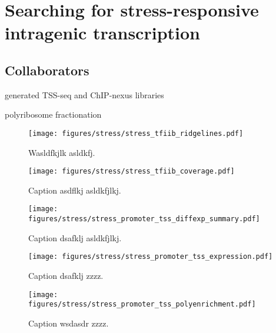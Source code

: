 \chapter{Searching for stress-responsive intragenic transcription}

\section{Collaborators}

\begin{description}[align=right, labelwidth=5cm, noitemsep]
    \item [Steve Doris] generated TSS-seq and ChIP-nexus libraries
    \item [Dan Spatt] polyribosome fractionation
\end{description}

\begin{figure}
\texttt{[image: figures/stress/stress\_tfiib\_ridgelines.pdf]}
\caption[TFIIB coverage over all genes with stress-induced intragenic TFIIB peaks.]{Wasldfkjlk asldkfj.}
\label{fig:stress_tfiib_ridgelines}
\end{figure}

\begin{figure}
\texttt{[image: figures/stress/stress\_tfiib\_coverage.pdf]}
\caption{Caption asdflkj asldkfjlkj.}
\label{fig:stress_tfiib_coverage}
\end{figure}

\begin{figure}
\texttt{[image: figures/stress/stress\_promoter\_tss\_diffexp\_summary.pdf]}
\caption{Caption dsafklj asldkfjlkj.}
\label{fig:stress_promoter_tss_diffexp_summary}
\end{figure}

\begin{figure}
\texttt{[image: figures/stress/stress\_promoter\_tss\_expression.pdf]}
\caption{Caption dsafklj zzzz.}
\label{fig:stress_promoter_tss_diffexp_summary}
\end{figure}

\begin{figure}
\texttt{[image: figures/stress/stress\_promoter\_tss\_polyenrichment.pdf]}
\caption{Caption wsdasdr zzzz.}
\label{fig:stress_promoter_tss_polyenrichment}
\end{figure}

\newpage

\begingroup
\singlespacing

\endgroup
